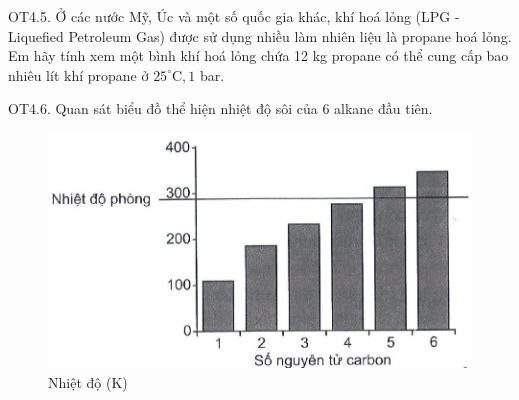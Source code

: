 \documentclass[10pt]{article}
\begin{document}
OT4.5. Ở các nước Mỹ, Úc và một số quốc gia khác, khí hoá lỏng (LPG - Liquefied Petroleum Gas) được sử dụng nhiều làm nhiên liệu là propane hoá lỏng. Em hãy tính xem một bình khí hoá lỏng chứa 12 kg propane có thể cung cấp bao nhiêu lít khí propane ở $25^{\circ} \mathrm{C}, 1$ bar.

OT4.6. Quan sát biểu đồ thể hiện nhiệt độ sôi của 6 alkane đầu tiên.

\begin{figure}[h]
\begin{center}
\captionsetup{labelformat=empty}
\caption{Nhiệt độ (K)}
  \includegraphics[width=\textwidth]{2025_10_23_ae7aef68fb3b41082d29g-32}
\end{center}
\end{figure}
\end{document}
